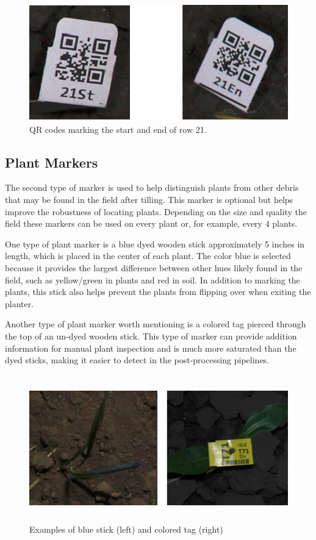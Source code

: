 \begin{figure}
	\centering
    \includegraphics[height=2in]{figures/row_codes.jpg}
    \caption[Row QR codes]{QR codes marking the start and end of row 21.}
    \label{figure:row_codes}
\end{figure}

\subsection{Plant Markers}
\label{section:plant_markers}

The second type of marker is used to help distinguish plants from other debris that may be found in the field after tilling.  This marker is optional but helps improve the robustness of locating plants.  Depending on the size and quality the field these markers can be used on every plant or, for example, every 4 plants. 

One type of plant marker is a blue dyed wooden stick approximately 5 inches in length, which is placed in the center of each plant. The color blue is selected because it provides the largest difference between other hues likely found in the field, such as yellow/green in plants and red in soil.  In addition to marking the plants, this stick also helps prevent the plants from flipping over when exiting the planter.

Another type of plant marker worth mentioning is a colored tag pierced through the top of an un-dyed wooden stick.  This type of marker can provide addition information for manual plant inspection and is much more saturated than the dyed sticks, making it easier to detect in the post-processing pipelines. 

\begin{figure}
	\centering
    \includegraphics[height=2.5in]{figures/plant_markers.jpg}
    \caption[Plant markers]{Examples of blue stick (left) and colored tag (right)}
    \label{figure:plant_markers}
\end{figure}
